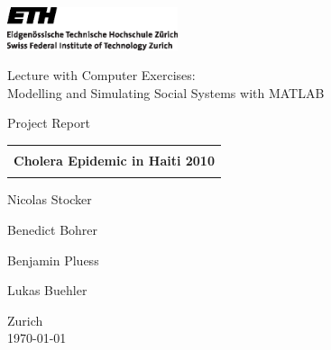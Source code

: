 
\thispagestyle{empty}

\begin{center}
\includegraphics[width=5cm]{Bilder/ETHlogo.eps}

\bigskip


\bigskip


\bigskip


\LARGE{ 	Lecture with Computer Exercises:\\ }
\LARGE{ Modelling and Simulating Social Systems with MATLAB\\}

\bigskip

\bigskip

\small{Project Report}\\

\bigskip

\bigskip

\bigskip

\bigskip


\begin{tabular}{|c|}
\hline
\\
\textbf{\LARGE{Cholera Epidemic in Haiti 2010}}\\
\\
\hline
\end{tabular}
\bigskip

\bigskip

\bigskip

\LARGE{Nicolas Stocker 

Benedict Bohrer

Benjamin Pluess 

Lukas Buehler}



\bigskip

\bigskip

\bigskip

\bigskip

\bigskip

\bigskip

\bigskip

\bigskip

Zurich\\
\today\\
\end{center}


